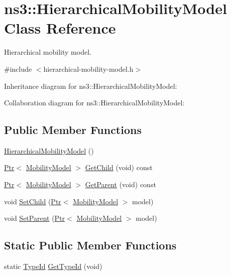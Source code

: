 \hypertarget{classns3_1_1HierarchicalMobilityModel}{}\section{ns3\+:\+:Hierarchical\+Mobility\+Model Class Reference}
\label{classns3_1_1HierarchicalMobilityModel}


Hierarchical mobility model.  




{\ttfamily \#include $<$hierarchical-\/mobility-\/model.\+h$>$}



Inheritance diagram for ns3\+:\+:Hierarchical\+Mobility\+Model\+:


Collaboration diagram for ns3\+:\+:Hierarchical\+Mobility\+Model\+:
\subsection*{Public Member Functions}
\begin{DoxyCompactItemize}
\item 
\hyperlink{classns3_1_1HierarchicalMobilityModel_a7c90a694a3be183f38bf1d6ea9e4216c}{Hierarchical\+Mobility\+Model} ()
\item 
\hyperlink{classns3_1_1Ptr}{Ptr}$<$ \hyperlink{classns3_1_1MobilityModel}{Mobility\+Model} $>$ \hyperlink{classns3_1_1HierarchicalMobilityModel_a44872560f7815311d92907d32428d93c}{Get\+Child} (void) const 
\item 
\hyperlink{classns3_1_1Ptr}{Ptr}$<$ \hyperlink{classns3_1_1MobilityModel}{Mobility\+Model} $>$ \hyperlink{classns3_1_1HierarchicalMobilityModel_a72d86fc82fe9dcd3fb50b86487f39111}{Get\+Parent} (void) const 
\item 
void \hyperlink{classns3_1_1HierarchicalMobilityModel_ac25ee0060180aaf841715684ad827521}{Set\+Child} (\hyperlink{classns3_1_1Ptr}{Ptr}$<$ \hyperlink{classns3_1_1MobilityModel}{Mobility\+Model} $>$ model)
\item 
void \hyperlink{classns3_1_1HierarchicalMobilityModel_a703a6a61e730333fb1527ce03c893cff}{Set\+Parent} (\hyperlink{classns3_1_1Ptr}{Ptr}$<$ \hyperlink{classns3_1_1MobilityModel}{Mobility\+Model} $>$ model)
\end{DoxyCompactItemize}
\subsection*{Static Public Member Functions}
\begin{DoxyCompactItemize}
\item 
static \hyperlink{classns3_1_1TypeId}{Type\+Id} \hyperlink{classns3_1_1HierarchicalMobilityModel_a0d4203c545238561910673a520994b76}{Get\+Type\+Id} (void)
\end{DoxyCompactItemize}
